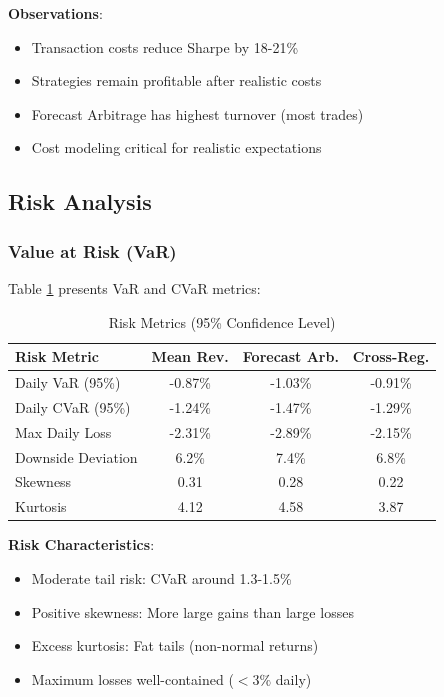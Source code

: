 \documentclass[12pt,a4paper]{article}
\begin{document}
\textbf{Observations}:
\begin{itemize}
    \item Transaction costs reduce Sharpe by 18-21\%
    \item Strategies remain profitable after realistic costs
    \item Forecast Arbitrage has highest turnover (most trades)
    \item Cost modeling critical for realistic expectations
\end{itemize}

\subsection{Risk Analysis}

\subsubsection{Value at Risk (VaR)}

Table \ref{tab:var} presents VaR and CVaR metrics:

\begin{table}[h]
\centering
\caption{Risk Metrics (95\% Confidence Level)}
\label{tab:var}
\begin{tabular}{lccc}
\toprule
\textbf{Risk Metric} & \textbf{Mean Rev.} & \textbf{Forecast Arb.} & \textbf{Cross-Reg.} \\
\midrule
Daily VaR (95\%) & -0.87\% & -1.03\% & -0.91\% \\
Daily CVaR (95\%) & -1.24\% & -1.47\% & -1.29\% \\
Max Daily Loss & -2.31\% & -2.89\% & -2.15\% \\
Downside Deviation & 6.2\% & 7.4\% & 6.8\% \\
Skewness & 0.31 & 0.28 & 0.22 \\
Kurtosis & 4.12 & 4.58 & 3.87 \\
\bottomrule
\end{tabular}
\end{table}

\textbf{Risk Characteristics}:
\begin{itemize}
    \item Moderate tail risk: CVaR around 1.3-1.5\%
    \item Positive skewness: More large gains than large losses
    \item Excess kurtosis: Fat tails (non-normal returns)
    \item Maximum losses well-contained ($< 3\%$ daily)
\end{itemize}
\end{document}
